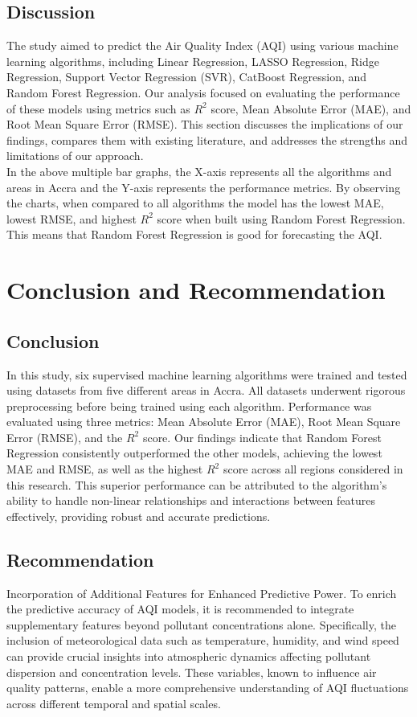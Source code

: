 \documentclass{book}
\numberwithin{equation}{section}
\numberwithin{figure}{section}
\begin{document}
\section{Discussion}
\label{discussion}
The study aimed to predict the Air Quality Index (AQI) using various machine learning algorithms, including Linear Regression, LASSO Regression, Ridge Regression, Support Vector Regression (SVR), CatBoost Regression, and Random Forest Regression. Our analysis focused on evaluating the performance of these models using metrics such as $R^{2}$ score, Mean Absolute Error (MAE), and Root Mean Square Error (RMSE). This section discusses the implications of our findings, compares them with existing literature, and addresses the strengths and limitations of our approach.\\
 In the above multiple bar graphs, the X-axis represents all the algorithms and areas in Accra and the Y-axis represents the performance metrics. By observing the charts, when compared to all algorithms the model has the lowest MAE, lowest RMSE, and highest $R^{2}$ score when built using Random Forest Regression. This means that Random Forest Regression is good for forecasting the AQI.
 \chapter{Conclusion and Recommendation}
 \label{ch5}
\section{Conclusion}
\label{conclusion}
In this study, six supervised machine learning algorithms were trained and tested using datasets from five different areas in Accra. All datasets underwent rigorous preprocessing before being trained using each algorithm. Performance was evaluated using three metrics: Mean Absolute Error (MAE), Root Mean Square Error (RMSE), and the $R^2$ score. 
Our findings indicate that Random Forest Regression consistently outperformed the other models, achieving the lowest MAE and RMSE, as well as the highest $R^2$ score across all regions considered in this research. This superior performance can be attributed to the algorithm's ability to handle non-linear relationships and interactions between features effectively, providing robust and accurate predictions.
\section{Recommendation}
\label{recommendation}
Incorporation of Additional Features for Enhanced Predictive Power. To enrich the predictive accuracy of AQI  models, it is recommended to integrate supplementary features beyond pollutant concentrations alone. Specifically, the inclusion of meteorological data such as temperature, humidity, and wind speed can provide crucial insights into atmospheric dynamics affecting pollutant dispersion and concentration levels. These variables, known to influence air quality patterns, enable a more comprehensive understanding of AQI fluctuations across different temporal and spatial scales.
\end{document}
